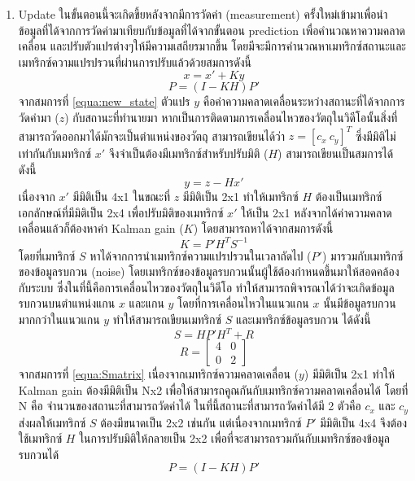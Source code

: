 \begin{enumerate}
	\item Update ในขั้นตอนนี้จะเกิดขึ้ยหลังจากมีการวัดค่า (measurement) ครั้งใหม่เข้ามาเพื่อนำข้อมูลที่ได้จากการวัดค่ามาเทียบกับข้อมูลที่ได้จากขั้นตอน prediction เพื่อคำนวณหาความคลาดเคลื่อน 
	และปรับตัวแปรต่างๆให้มีความเสถียรมากขึ้น โดยมีจะมีการคำนวณหาเมทริกซ์สถานะและเมทริกซ์ความแปรปรวนที่ผ่านการปรับแล้วด้วยสมการดังนี้
	\begin{equation}
		x = x' + Ky
		\label{equa:new_state}
	\end{equation}
	\begin{equation}
		P = (I-KH)P'
		\label{equa:new_covariance}
	\end{equation}
	จากสมการที่ \ref{equa:new_state} ตัวแปร $y$ คือค่าความคลาดเคลื่อนระหว่างสถานะที่ได้จากการวัดค่ามา ($z$) กับสถานะที่ทำนายมา 
	หากเป็นการติดตามการเคลื่อนไหวของวัตถุในวิดีโอนั้นสิ่งที่สามารถวัดออกมาได้มักจะเป็นตำแหน่งของวัตถุ สามารถเขียนได้ว่า $z=[c_x\ c_y]^T$ ซึ่งมีมิติไม่เท่ากันกับเมทริกซ์ $x'$ 
	จึงจำเป็นต้องมีเมทริกซ์สำหรับปรับมิติ ($H$) สามารถเขียนเป็นสมการได้ดังนี้
	\begin{equation}
		y = z - Hx'
	\end{equation}
	เนื่องจาก $x'$ มีมิติเป็น 4x1 ในขณะที่ $z$ มีมิติเป็น 2x1 ทำให้เมทริกซ์ $H$ ต้องเป็นเมทริกซ์เอกลักษณ์ที่มีมิติเป็น 2x4 เพื่อปรับมิติของเมทริกซ์ $x'$ ให้เป็น 2x1 หลังจากได้ค่าความคลาดเคลื่อนแล้วก็ต้องหาค่า
	Kalman gain ($K$) โดยสามารถหาได้จากสมการดังนี้
	\begin{equation}
		K = P'H^TS^{-1}
	\end{equation}
	โดยที่เมทริกซ์ $S$ หาได้จากการนำเมทริกซ์ความแปรปรวนในเวลาถัดไป ($P'$) มารวมกับเมทริกซ์ของข้อมูลรบกวน (noise) โดยเมทริกซ์ของข้อมูลรบกวนนั้นผู้ใช้ต้องกำหนดขึ้นมาให้สอดคล้องกับระบบ 
	ซึ่งในที่นี้คือการเคลื่อนไหวของวัตถุในวิดีโอ ทำให้สามารถพิจารณาได้ว่าจะเกิดข้อมูลรบกวนบนตำแหน่งแกน $x$ และแกน $y$ โดยที่การเคลื่อนไหวในแนวแกน $x$ นั้นมีข้อมูลรบกวนมากกว่าในแนวแกน $y$ 
	ทำให้สามารถเขียนเมทริกซ์ $S$ และเมทริกซ์ข้อมูลรบกวน  ได้ดังนี้
	\begin{equation}
		S = HP'H^T + R
		\label{equa:Smatrix}
	\end{equation}
	\begin{equation*}
		R = \begin{bmatrix}
			4 & 0\\ 
			0 & 2
			\end{bmatrix}
	\end{equation*}
	จากสมการที่ \ref{equa:Smatrix} เนื่องจากเมทริกซ์ความคลาดเคลื่อน ($y$) มีมิติเป็น 2x1 ทำให้ Kalman gain ต้องมีมิติเป็น Nx2 เพื่อให้สามารถคูณกันกับเมทริกซ์ความคลาดเคลื่อนได้ โดยที่ N คือ
	จำนวนของสถานะที่สามารถวัดค่าได้ ในที่นี้สถานะที่สามารถวัดค่าได้มี 2 ตัวคือ $c_x$ และ $c_y$ ส่งผลให้เมทริกซ์ $S$ ต้องมีขนาดเป็น 2x2 เช่นกัน แต่เนื่องจากเมทริกซ์ $P'$ มีมิติเป็น 4x4 จึงต้องใช้เมทริกซ์ $H$ 
	ในการปรับมิติให้กลายเป็น 2x2 เพื่อที่จะสามารถรวมกันกับเมทริกซ์ของข้อมูลรบกวนได้
	\begin{equation}
		P = (I-KH)P'
	\end{equation}
\end{enumerate}
